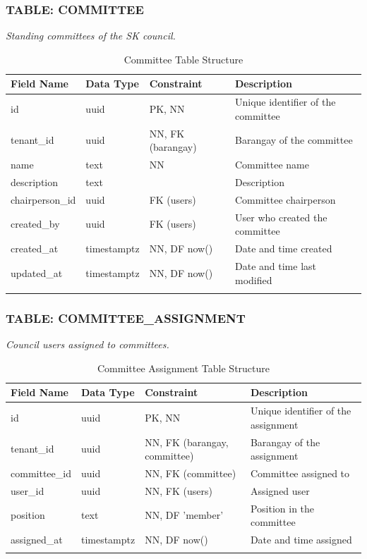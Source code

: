 \subsubsection*{TABLE: COMMITTEE}
\noindent\textit{Standing committees of the SK council.}
\begin{longtable}{|p{3.2cm}|p{2.2cm}|p{3.2cm}|p{5.4cm}|}
\hline
\textbf{Field Name} & \textbf{Data Type} & \textbf{Constraint} & \textbf{Description} \\ \hline
\endhead
\hline \endfoot
\hline \endlastfoot
id & uuid & PK, NN & Unique identifier of the committee \\ \hline
tenant\_id & uuid & NN, FK (barangay) & Barangay of the committee \\ \hline
name & text & NN & Committee name \\ \hline
description & text & & Description \\ \hline
chairperson\_id & uuid & FK (users) & Committee chairperson \\ \hline
created\_by & uuid & FK (users) & User who created the committee \\ \hline
created\_at & timestamptz & NN, DF now() & Date and time created \\ \hline
updated\_at & timestamptz & NN, DF now() & Date and time last modified \\ \hline
\caption{Committee Table Structure}
\label{tab:committee}
\end{longtable}
\vspace{3mm}

\subsubsection*{TABLE: COMMITTEE\_ASSIGNMENT}
\noindent\textit{Council users assigned to committees.}
\begin{longtable}{|p{3.2cm}|p{2.2cm}|p{3.2cm}|p{5.4cm}|}
\hline
\textbf{Field Name} & \textbf{Data Type} & \textbf{Constraint} & \textbf{Description} \\ \hline
\endhead
\hline \endfoot
\hline \endlastfoot
id & uuid & PK, NN & Unique identifier of the assignment \\ \hline
tenant\_id & uuid & NN, FK (barangay, committee) & Barangay of the assignment \\ \hline
committee\_id & uuid & NN, FK (committee) & Committee assigned to \\ \hline
user\_id & uuid & NN, FK (users) & Assigned user \\ \hline
position & text & NN, DF 'member' & Position in the committee \\ \hline
assigned\_at & timestamptz & NN, DF now() & Date and time assigned \\ \hline
\caption{Committee Assignment Table Structure}
\label{tab:committee_assignment}
\end{longtable}
\vspace{3mm}

